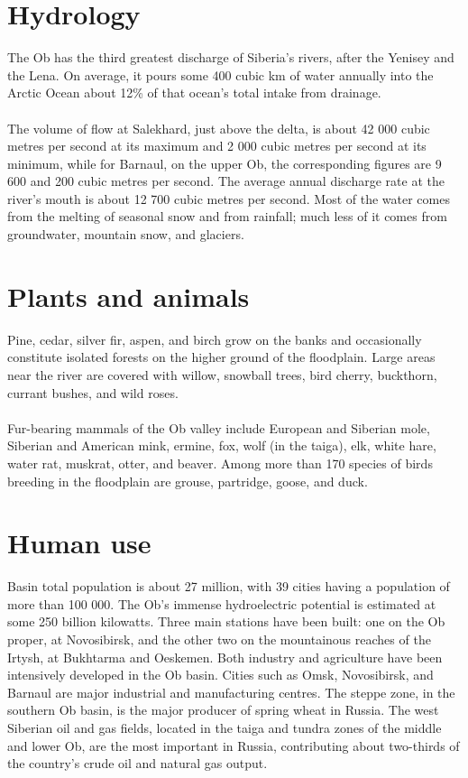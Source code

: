 \section{Hydrology}
The Ob has the third greatest discharge of Siberia's rivers, after the Yenisey and the Lena. On average, it pours some 400 cubic km of water annually into the Arctic Ocean about 12\% of that ocean's total intake from drainage.\\\\
The volume of flow at Salekhard, just above the delta, is about 42 000 cubic metres per second at its maximum and 2 000 cubic metres per second at its minimum, while for Barnaul, on the upper Ob, the corresponding figures are 9 600 and 200 cubic metres per second. The average annual discharge rate at the river's mouth is about 12 700 cubic metres per second. Most of the water comes from the melting of seasonal snow and from rainfall; much less of it comes from groundwater, mountain snow, and glaciers.\cite{Obriver}
\section{Plants and animals}
Pine, cedar, silver fir, aspen, and birch grow on the banks and occasionally constitute isolated forests on the higher ground of the floodplain. Large areas near the river are covered with willow, snowball trees, bird cherry, buckthorn, currant bushes, and wild roses.\\\\
Fur-bearing mammals of the Ob valley include European and Siberian mole, Siberian and American mink, ermine, fox, wolf (in the taiga), elk, white hare, water rat, muskrat, otter, and beaver. Among more than 170 species of birds breeding in the floodplain are grouse, partridge, goose, and duck.
\section{Human use}
Basin total population is about 27 million, with 39 cities having a population of more than 100 000. The Ob's immense hydroelectric potential is estimated at some 250 billion kilowatts. Three main stations have been built: one on the Ob proper, at Novosibirsk, and the other two on the mountainous reaches of the Irtysh, at Bukhtarma and Oeskemen. Both industry and agriculture have been intensively developed in the Ob basin. Cities such as Omsk, Novosibirsk, and Barnaul are major industrial and manufacturing centres. The steppe zone, in the southern Ob basin, is the major producer of spring wheat in Russia. The west Siberian oil and gas fields, located in the taiga and tundra zones of the middle and lower Ob, are the most important in Russia, contributing about two-thirds of the country's crude oil and natural gas output.